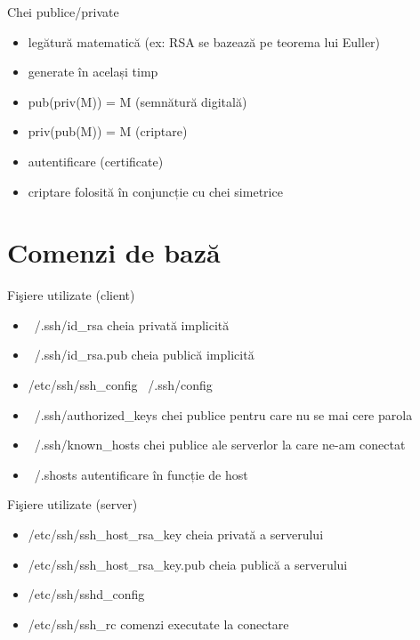 \documentclass{beamer}
\begin{document}
\begin{frame}{Chei publice/private}
  \begin{itemize}
    \item legătură matematică (ex: RSA se bazează pe teorema lui Euller)
    \item generate în același timp
    \item pub(priv(M)) = M (semnătură digitală)
    \item priv(pub(M)) = M (criptare)
    \item autentificare (certificate)
    \item criptare folosită în conjuncție cu chei simetrice
  \end{itemize}
\end{frame}

\section{Comenzi de bază}
\frame{\tableofcontents[currentsection]}

\begin{frame}{Fişiere utilizate (client)}
	\begin{itemize}
		\item ~/.ssh/id\_rsa cheia privată implicită
		\item ~/.ssh/id\_rsa.pub cheia publică implicită
		\item /etc/ssh/ssh\_config ~/.ssh/config 
		\item ~/.ssh/authorized\_keys chei publice pentru care nu se mai cere
			parola
		\item ~/.ssh/known\_hosts chei publice ale serverlor la care ne-am
			conectat
		\item ~/.shosts autentificare în funcție de host
	\end{itemize}
\end{frame}

\begin{frame}{Fişiere utilizate (server)}
	\begin{itemize}
		\item /etc/ssh/ssh\_host\_rsa\_key cheia privată a serverului
		\item /etc/ssh/ssh\_host\_rsa\_key.pub cheia publică a serverului
		\item /etc/ssh/sshd\_config
		\item /etc/ssh/ssh\_rc	comenzi executate la conectare
	\end{itemize}
\end{frame}
\end{document}
